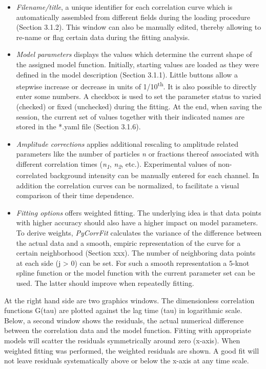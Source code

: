 \begin{itemize}
\item \textit{Filename/title}, a unique identifier for each correlation curve which is automatically assembled from different fields during the loading procedure (Section 3.1.2). This window can also be manually edited, thereby allowing to re-name or flag certain data during the fitting analysis. 
\item \textit{Model parameters} displays the values which determine the current shape of the assigned model function. Initially, starting values are loaded as they were defined in the model description (Section 3.1.1). Little buttons allow a stepwise increase or decrease in units of 1/10\textsuperscript{th}. It is also possible to directly enter some numbers. A checkbox is used to set the parameter status to {\textquotesingle}varied{\textquotesingle} (checked) or {\textquotesingle}fixed{\textquotesingle} (unchecked) during the fitting. At the end, when saving the session, the current set of values together with their indicated names are stored in the *.yaml file (Section 3.1.6). 
\item \textit{Amplitude corrections} applies additional rescaling to amplitude related parameters like the number of particles \textit{n} or fractions thereof associated with different correlation times (\textit{n}\textit{\textsubscript{1}}, \textit{n}\textit{\textsubscript{2}}, etc.). Experimental values of non-correlated background intensity can be manually entered for each channel. In addition the correlation curves can be normalized, to facilitate a visual comparison of their time dependence.
\item \textit{Fitting options} offers weighted fitting. The underlying idea is that data points with higher accuracy should also have a higher impact on model parameters. To derive weights, \textit{PyCorrFit} calculates the variance of the difference between the actual data and a smooth, empiric representation of the curve for a certain neighborhood (Section xxx). The number of neighboring data points at each side (j {\textgreater} 0) can be set. For such a smooth representation a 5-knot spline function or the model function with the current parameter set can be used. The latter should improve when repeatedly fitting.
\end{itemize}
At the right hand side are two graphics windows. The dimensionless correlation functions G(tau) are plotted against the lag time (tau) in logarithmic scale. Below, a second window shows the residuals, the actual numerical difference between the correlation data and the model function. Fitting with appropriate models will scatter the residuals symmetrically around zero (x-axis). When weighted fitting was performed, the weighted residuals are shown. A good fit will not leave residuals systematically above or below the x-axis at any time scale.

